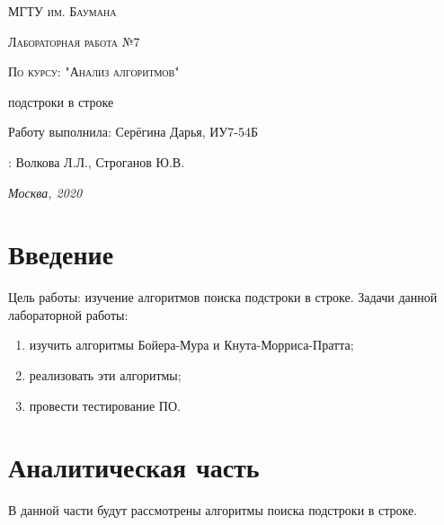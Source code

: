 \documentclass[12pt]{report}
\begin{document}
\begin{titlepage}
	\centering
	{\scshape\LARGE МГТУ им. Баумана \par}
	\vspace{3cm}
	{\scshape\Large Лабораторная работа №7\par}
	\vspace{0.5cm}	
	{\scshape\Large По курсу: "Анализ алгоритмов"\par}
	\vspace{1.5cm}
	{\huge{} подстроки в строке\par}
	\vspace{2cm}
	\Large Работу выполнила: Серёгина Дарья, ИУ7-54Б\par
	\vspace{0.5cm}
	:  Волкова Л.Л., Строганов Ю.В.\par

	\vfill
	\large \textit {Москва, 2020} \par
\end{titlepage}

\tableofcontents

\newpage
\chapter*{Введение}
Цель работы: изучение алгоритмов поиска подстроки в строке.
\newline
Задачи данной лабораторной работы:
\begin{enumerate}
        \item изучить алгоритмы Бойера-Мура и Кнута-Морриса-Пратта;
        \item реализовать эти алгоритмы;
        \item провести тестирование ПО.
\end{enumerate}



\chapter{Аналитическая часть}
В данной части будут рассмотрены алгоритмы поиска подстроки в строке.
\end{document}
